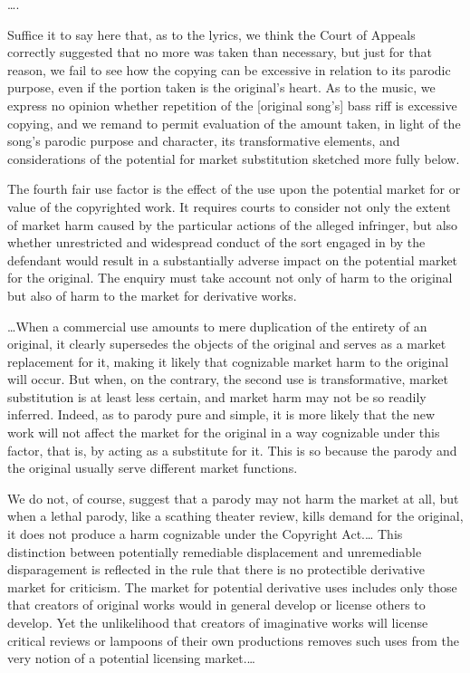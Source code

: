 \ldots.

Suffice it to say here that, as to the lyrics, we think the Court of Appeals
correctly suggested that no more was taken than necessary,
but just for that reason, we fail to see how the copying can be excessive
in relation to its parodic purpose, even if the portion taken is the original's
heart. As to the music, we express no opinion whether repetition of the
[original song's] bass
riff is excessive copying, and we remand to permit evaluation of the amount
taken, in light of the song's parodic purpose and character, its transformative
elements, and considerations of the potential for market substitution sketched
more fully below.




The fourth fair use factor is the effect of the use upon the potential market
for or value of the copyrighted work. It requires courts to
consider not only the extent of market harm caused by the particular actions of
the alleged infringer, but also whether unrestricted and widespread conduct of
the sort engaged in by the defendant would result in a substantially
adverse impact on the potential market for the original.
The enquiry must take account not only of harm to the original
but also of harm to the market for derivative works.

\ldots When a commercial use amounts to
mere duplication of the entirety of an original, it clearly supersedes the
objects of the original and
serves as a market replacement for it, making it likely that cognizable market
harm to the original will occur. But when, on the
contrary, the second use is transformative, market substitution is at least less
certain, and market harm may not be so readily inferred. Indeed, as to parody
pure and simple, it is more likely that the new work will not affect the market
for the original in a way cognizable under this factor, that is, by acting as a
substitute for it.
This is so because the parody and the original usually
serve different market functions.

We do not, of course, suggest that a parody may not harm the market at all, but
when a lethal parody, like a scathing theater review, kills demand for the
original, it does not produce a harm cognizable under the Copyright Act.\ldots
This distinction between potentially remediable displacement and unremediable
disparagement is reflected in the rule that there is no protectible derivative
market for criticism. The market for potential derivative uses includes only
those that creators of original works would in general develop or license others
to develop. Yet the unlikelihood that creators of imaginative works will license
critical reviews or lampoons of their own productions removes such uses from the
very notion of a potential licensing market.\ldots\unskip{}

